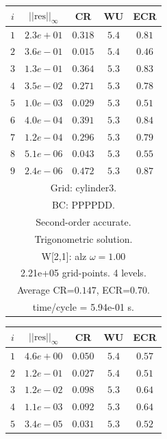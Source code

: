 \begin{table}[hbt]
\begin{center}
\begin{tabular}{|c|c|c|c|c|} \hline 
 $i$   & $\vert\vert\mbox{res}\vert\vert_\infty$  &  CR     &  WU    & ECR  \\   \hline 
 $ 1$  & $ 2.3e+01$ & $0.318$ & $ 5.4$ & $0.81$ \\ 
 $ 2$  & $ 3.6e-01$ & $0.015$ & $ 5.4$ & $0.46$ \\ 
 $ 3$  & $ 1.3e-01$ & $0.364$ & $ 5.3$ & $0.83$ \\ 
 $ 4$  & $ 3.5e-02$ & $0.271$ & $ 5.3$ & $0.78$ \\ 
 $ 5$  & $ 1.0e-03$ & $0.029$ & $ 5.3$ & $0.51$ \\ 
 $ 6$  & $ 4.0e-04$ & $0.391$ & $ 5.3$ & $0.84$ \\ 
 $ 7$  & $ 1.2e-04$ & $0.296$ & $ 5.3$ & $0.79$ \\ 
 $ 8$  & $ 5.1e-06$ & $0.043$ & $ 5.3$ & $0.55$ \\ 
 $ 9$  & $ 2.4e-06$ & $0.472$ & $ 5.3$ & $0.87$ \\ 
\hline 
\multicolumn{5}{|c|}{Grid: cylinder3.}  \\
\multicolumn{5}{|c|}{BC: PPPPDD.}  \\
\multicolumn{5}{|c|}{Second-order accurate.}  \\
\multicolumn{5}{|c|}{Trigonometric solution.}  \\
\multicolumn{5}{|c|}{W[2,1]: alz $\omega=1.00$}  \\
\multicolumn{5}{|c|}{2.21e+05 grid-points. 4 levels.}  \\
\multicolumn{5}{|c|}{Average CR=$0.147$, ECR=$0.70$.}  \\
\multicolumn{5}{|c|}{time/cycle = 5.94e-01 s.}  \\
\hline 
\end{tabular}
\qquad
\begin{tabular}{|c|c|c|c|c|} \hline 
 $i$   & $\vert\vert\mbox{res}\vert\vert_\infty$  &  CR     &  WU    & ECR  \\   \hline 
 $ 1$  & $ 4.6e+00$ & $0.050$ & $ 5.4$ & $0.57$ \\ 
 $ 2$  & $ 1.2e-01$ & $0.027$ & $ 5.4$ & $0.51$ \\ 
 $ 3$  & $ 1.2e-02$ & $0.098$ & $ 5.3$ & $0.64$ \\ 
 $ 4$  & $ 1.1e-03$ & $0.092$ & $ 5.3$ & $0.64$ \\ 
 $ 5$  & $ 3.4e-05$ & $0.031$ & $ 5.3$ & $0.52$ \\ 

\end{tabular}
\end{center}
\end{table}
